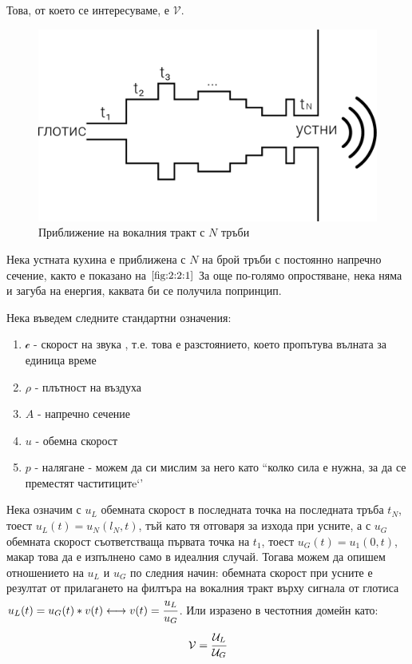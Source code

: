 \documentclass[12pt]{report}
\numberwithin{equation}{section}
\numberwithin{figure}{section}
\begin{document}
   Това, от което се интересуваме, е $\mathcal{V}$.
    \begin{figure}[ht]%
        \includegraphics[width=\textwidth]{vocal_tubes}%
        \caption{Приближение на вокалния тракт с $N$ тръби}%
        \label{fig:2:2:1}
    \end{figure}

    Нека устната кухина е приближена с $N$ на брой тръби с постоянно напречно сечение, както е показано на $\autoref{fig:2:2:1}$
    За още по-голямо опростяване, нека няма и загуба на енергия, каквата би се получила попринцип.

    Нека въведем следните стандартни означения:
    \begin{enumerate}
        \item{$\mathcal{c}$} - скорост на звука , т.е. това е разстоянието, което пропътува вълната за единица време
        \item{$\rho$} - плътност на въздуха
        \item{$A$} - напречно сечение
        \item{$u$} - обемна скорост
        \item{$p$} -  налягане - можем да си мислим за него като ``колко сила е нужна, за да се преместят частитицитe`'
    \end{enumerate}
    
    Нека означим с $u_L$ обемната скорост в последната точка на последната тръба $t_N$, тоест $u_L(t) = u_N(l_N, t)$, тъй като тя отговаря за изхода при усните, 
    а с $u_G$ обемната скорост съответстваща първата точка на $t_1$, тоест $u_G(t) = u_1(0, t)$, макар това да е изпълнено само в идеалния случай.
    Тогава можем да опишем отношението на $u_L$ и $u_G$ по следния начин: обемната скорост при усните е резултат от прилагането на филтъра на вокалния тракт върху сигнала
    от глотиса  $u_L(t) = u_G(t)\ast v(t) \longleftrightarrow v(t) = \cfrac{u_L}{u_G}$.
    Или изразено в честотния домейн като:
    \[
        \mathcal{V} = \cfrac{\mathcal{U}_L}{\mathcal{U}_G}
    \]
\end{document}
